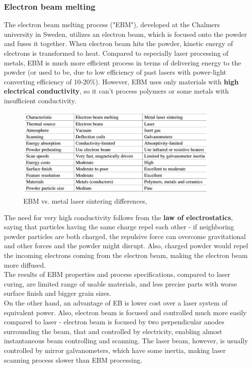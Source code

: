 \documentclass[a4paper, twoside, 11pt]{report}
\begin{document}
\subsubsection{Electron beam melting}
The electron beam melting process ("EBM"), developed at the Chalmers university in Sweden, utilizes an electron beam, which is focused onto the powder and fuses it together. When electron beam hits the powder, kinetic energy of electrons is transformed to heat. Compared to especially laser processing of metals, EBM is much more efficient process in terms of delivering energy to the powder (or used to be, due to low efficiency of past lasers with power-light converting efficiency of 10-20\%). However, EBM uses only materials with \textbf{high electrical conductivity}, so it can't process polymers or some metals with insufficient conductivity.\\
\begin{figure}[h]
	\centering
	\includegraphics[width=0.9\textwidth]{EbmMlsDifferences}
	\caption{EBM vs. metal laser sintering differences, \cite[p. 137]{AMT}}
\end{figure}
	The need for very high conductivity follows from the \textbf{law of electrostatics}, saying that particles having the same charge repel each other - if neighboring powder particles are both charged, the repulsive force can overcome gravitational and other forces and the powder might disrupt. Also, charged powder would repel the incoming electrons coming from the electron beam, making the electron beam more diffused.\\
	The results of EBM properties and process specifications, compared to laser curing, are limited range of usable materials, and less precise parts with worse surface finish and bigger grain sizes.\\
	On the other hand, an advantage of EB is lower cost over a laser system of equivalent power. Also, electron beam is focused and controlled much more easily compared to laser - electron beam is focused by two perpendicular anodes surrounding the beam, that and controlled by electricity, enabling almost instantaneous beam controlling and scanning. The laser beam, however, is usually controlled by mirror galvanometers, which have some inertia, making laser scanning process slower than EBM processing.
	
\end{document}
